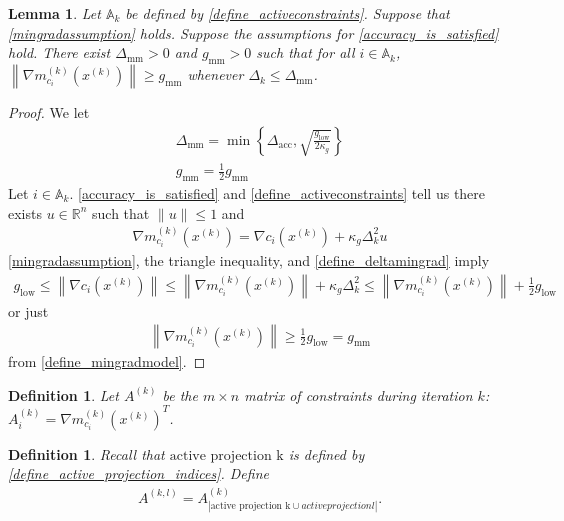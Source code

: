 \documentclass{article}
\newtheorem{definition}[theorem]{Definition}
\newtheorem{lemma}[theorem]{Lemma}
\theoremstyle{case}
\numberwithin{theorem}{subsection}
\newcommand{\activeconstraintsk}{{\mathbb A_{k}}}
\newcommand{\dacc}{{\Delta_{\textrm{acc}}}}
\newcommand{\dk}{\Delta_k}
\newcommand{\gmcik}{{\nabla m_{c_i}^{(k)}\left(\xk\right)}}
\newcommand{\mingrad}{{ g_{\textrm{low}} }}
\newcommand{\Rn}{\mathbb R^n}
\newcommand{\xk}{x^{(k)}}
\newcommand{\deltamingrad}{{\Delta_{\textrm{mm}}}}
\newcommand{\mingradmodel}{{ g_{\textrm{mm}} }}
\newcommand{\activeprojk}{{\textrm{active projection k}}}
\newcommand{\activeprojl}{{active projection l}}
\begin{document}
\color{red}
\begin{lemma}
Let $\activeconstraintsk$ be defined by \cref{define_activeconstraints}.
Suppose that \cref{mingradassumption} holds.
Suppose the assumptions for \cref{accuracy_is_satisfied} hold.
There exist $\deltamingrad > 0$ and $\mingradmodel > 0$ such that for all $i \in \activeconstraintsk$, 
 $\left\|\gmcik\right\| \ge \mingradmodel $ whenever $\dk \le \deltamingrad$.
\end{lemma}
\begin{proof}
We let
\begin{align}
\deltamingrad = \min\left\{\dacc, \sqrt{\frac{\mingrad}{2\kappa_g}}\right\} \label{define_deltamingrad} \\
\mingradmodel = \frac 1 2 \mingradmodel \label{define_mingradmodel}
\end{align}
Let $i \in \activeconstraintsk$.
\cref{accuracy_is_satisfied} and \cref{define_activeconstraints} tell us there exists $u \in \Rn$ such that $\|u\| \le 1$ and
\begin{align*}
\gmcik = \nabla c_i\left(\xk\right) + \kappa_g \dk^2 u
\end{align*}
\cref{mingradassumption}, the triangle inequality, and \cref{define_deltamingrad} imply
\begin{align*}
\mingrad \le \left\|\nabla c_i\left(\xk\right)\right\| \le \left\|\gmcik\right\| + \kappa_g \dk^2 \le \left\|\gmcik\right\| + \frac 1 2 \mingrad
\end{align*}
or just
\begin{align*}
\left\|\gmcik\right\| \ge \frac 1 2 \mingrad = \mingradmodel
\end{align*}
from \cref{define_mingradmodel}.

\end{proof}
\color{black}


\begin{definition}
Let $A^{(k)}$ be the $m \times n$ matrix of constraints during iteration $k$: $A^{(k)}_i = \gmcik^T$.
\end{definition}

\begin{definition}
Recall that $\activeprojk$ is defined by \cref{define_active_projection_indices}.
Define
\begin{align}
A^{(k, l)} = A^{(k)}_{\left|\activeprojk \cup \activeprojl\right|}.
\end{align}
\end{definition}
\end{document}
